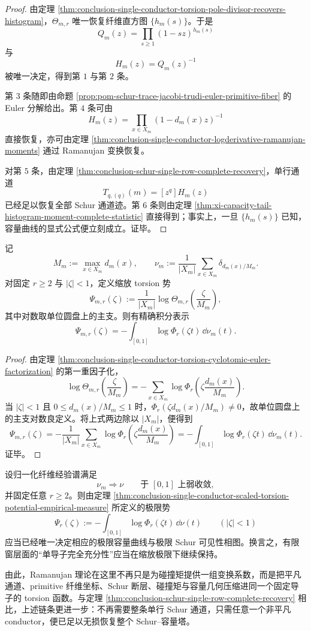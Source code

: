 \begin{proof}
由定理 \ref{thm:conclusion-single-conductor-torsion-pole-divisor-recovers-histogram}，\(\Theta_{m,r}\) 唯一恢复纤维直方图 \(\{h_m(s)\}\)。于是
\[
Q_m(z)=\prod_{s\ge 1}(1-sz)^{h_m(s)}
\]
与
\[
H_m(z)=Q_m(z)^{-1}
\]
被唯一决定，得到第 \(1\) 与第 \(2\) 条。

第 \(3\) 条随即由命题 \ref{prop:pom-schur-trace-jacobi-trudi-euler-primitive-fiber} 的 Euler 分解给出。第 \(4\) 条可由
\[
H_m(z)=\prod_{x\in X_m}(1-d_m(x)z)^{-1}
\]
直接恢复，亦可由定理 \ref{thm:conclusion-single-conductor-logderivative-ramanujan-moments} 通过 Ramanujan 变换恢复。

对第 \(5\) 条，由定理 \ref{thm:conclusion-schur-single-row-complete-recovery}，单行通道
\[
T_{q,(q)}(m)=[z^q]H_m(z)
\]
已经足以恢复全部 Schur 通道迹。第 \(6\) 条则由定理 \ref{thm:xi-capacity-tail-histogram-moment-complete-statistic} 直接得到；事实上，一旦 \(\{h_m(s)\}\) 已知，容量曲线的显式公式便立刻成立。证毕。
\end{proof}

\begin{theorem}\label{thm:conclusion-single-conductor-scaled-torsion-potential-empirical-measure}
记
\[
M_m:=\max_{x\in X_m}d_m(x),
\qquad
\nu_m:=\frac1{|X_m|}\sum_{x\in X_m}\delta_{d_m(x)/M_m}.
\]
对固定 \(r\ge 2\) 与 \(|\zeta|<1\)，定义缩放 torsion 势
\[
\Psi_{m,r}(\zeta):=\frac1{|X_m|}\log\Theta_{m,r}\!\left(\frac{\zeta}{M_m}\right),
\]
其中对数取单位圆盘上的主支。则有精确积分表示
\[
\Psi_{m,r}(\zeta)
=
-\int_{[0,1]}\log \Phi_r(\zeta t)\,\dd\nu_m(t).
\]
\end{theorem}

\begin{proof}
由定理 \ref{thm:conclusion-single-conductor-torsion-cyclotomic-euler-factorization} 的第一重因子化，
\[
\log\Theta_{m,r}\!\left(\frac{\zeta}{M_m}\right)
=
-\sum_{x\in X_m}\log\Phi_r\!\left(\zeta\frac{d_m(x)}{M_m}\right).
\]
当 \(|\zeta|<1\) 且 \(0\le d_m(x)/M_m\le 1\) 时，\(\Phi_r(\zeta d_m(x)/M_m)\neq 0\)，故单位圆盘上的主支对数良定义。将上式两边除以 \(|X_m|\)，便得到
\[
\Psi_{m,r}(\zeta)
=
-\frac1{|X_m|}\sum_{x\in X_m}\log\Phi_r\!\left(\zeta\frac{d_m(x)}{M_m}\right)
=
-\int_{[0,1]}\log \Phi_r(\zeta t)\,\dd\nu_m(t).
\]
证毕。
\end{proof}

\begin{conjecture}\label{conj:conclusion-single-conductor-torsion-thermodynamic-sufficiency}
设归一化纤维经验谱满足
\[
\nu_m\Rightarrow \nu
\qquad
\text{于 }[0,1]\text{ 上弱收敛},
\]
并固定任意 \(r\ge 2\)。则由定理 \ref{thm:conclusion-single-conductor-scaled-torsion-potential-empirical-measure} 所定义的极限势
\[
\Psi_r(\zeta):=
-\int_{[0,1]}\log \Phi_r(\zeta t)\,\dd\nu(t)
\qquad
(|\zeta|<1)
\]
应当已经唯一决定相应的极限容量曲线与极限 Schur 可见性相图。换言之，有限窗层面的“单导子完全充分性”应当在缩放极限下继续保持。
\end{conjecture}

\noindent
由此，Ramanujan 理论在这里不再只是为碰撞矩提供一组变换系数，而是把平凡通道、primitive 纤维坐标、Schur 断层、碰撞矩与容量几何压缩进同一个固定导子的 torsion 函数。与定理 \ref{thm:conclusion-schur-single-row-complete-recovery} 相比，上述链条更进一步：不再需要整条单行 Schur 通道，只需任意一个非平凡 conductor，便已足以无损恢复整个 Schur--容量塔。
